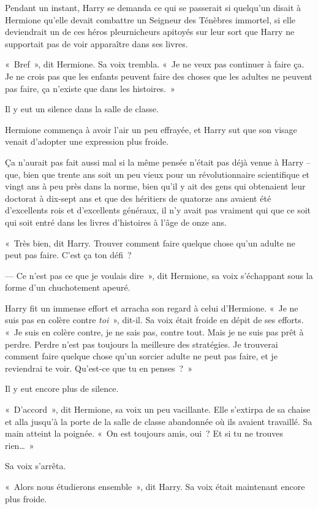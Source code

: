 Pendant un instant, Harry se demanda ce qui se passerait si quelqu'un disait à Hermione qu'elle devait combattre un Seigneur des Ténèbres immortel, si elle deviendrait un de ces héros pleurnicheurs apitoyés sur leur sort que Harry ne supportait pas de voir apparaître dans ses livres.

«~Bref~», dit Hermione. Sa voix trembla. «~Je ne veux pas continuer à faire ça. Je ne crois pas que les enfants peuvent faire des choses que les adultes ne peuvent pas faire, ça n'existe que dans les histoires.~»

Il y eut un silence dans la salle de classe.

Hermione commença à avoir l'air un peu effrayée, et Harry sut que son visage venait d'adopter une expression plus froide.

Ça n'aurait pas fait aussi mal si la même pensée n'était pas déjà venue à Harry -- que, bien que trente ans soit un peu vieux pour un révolutionnaire scientifique et vingt ans à peu près dans la norme, bien qu'il y ait des gens qui obtenaient leur doctorat à dix-sept ans et que des héritiers de quatorze ans avaient été d'excellents rois et d'excellents généraux, il n'y avait pas vraiment qui que ce soit qui soit entré dans les livres d'histoires à l'âge de onze ans.

«~Très bien, dit Harry. Trouver comment faire quelque chose qu'un adulte ne peut pas faire. C'est ça ton défi~?

--- Ce n'est pas ce que je voulais dire~», dit Hermione, sa voix s'échappant sous la forme d'un chuchotement apeuré.

Harry fit un immense effort et arracha son regard à celui d'Hermione. «~Je ne suis pas en colère contre \emph{toi}~», dit-il. Sa voix était froide en dépit de ses efforts. «~Je suis en colère contre, je ne sais pas, contre tout. Mais je ne suis pas prêt à perdre. Perdre n'est pas toujours la meilleure des stratégies. Je trouverai comment faire quelque chose qu'un sorcier adulte ne peut pas faire, et je reviendrai te voir. Qu'est-ce que tu en penses~?~»

Il y eut encore plus de silence.

«~D'accord~», dit Hermione, sa voix un peu vacillante. Elle s'extirpa de sa chaise et alla jusqu'à la porte de la salle de classe abandonnée où ils avaient travaillé. Sa main atteint la poignée. «~On est toujours amis, oui~? Et si tu ne trouves rien…~»

Sa voix s'arrêta.

«~Alors nous étudierons ensemble~», dit Harry. Sa voix était maintenant encore plus froide.

